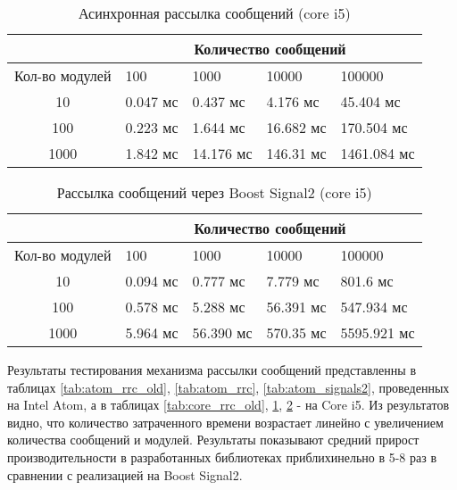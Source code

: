 \begin{table}[htb]
    \caption{\label{tab:core_rrc}Асинхронная рассылка сообщений (core i5)}
    \begin{center}
        \begin{tabularx}{\textwidth}{|c|X|X|X|X|}
            \hline
            & \multicolumn{4}{|c|}{Количество сообщений} \\
            \hline
            Кол-во модулей & 100   & 1000   & 10000   & 100000   \\
            \hline
            10             & 0.047 мс  & 0.437 мс   & 4.176 мс   & 45.404 мс   \\
            \hline
            100            & 0.223 мс  & 1.644 мс  & 16.682 мс  & 170.504 мс  \\
            \hline
            1000           & 1.842 мс & 14.176 мс & 146.31 мс & 1461.084 мс \\
            \hline
        \end{tabularx}
    \end{center}
\end{table}

\begin{table}[htb]
    \caption{\label{tab:core_signals2}Рассылка сообщений через Boost Signal2 (core i5)}
    \begin{center}
        \begin{tabularx}{\textwidth}{|c|X|X|X|X|}
            \hline
            & \multicolumn{4}{|c|}{Количество сообщений} \\
            \hline
            Кол-во модулей & 100   & 1000   & 10000   & 100000   \\
            \hline
            10             & 0.094 мс  & 0.777 мс   & 7.779 мс   & 801.6 мс   \\
            \hline
            100            & 0.578 мс  & 5.288 мс  & 56.391 мс  & 547.934 мс  \\
            \hline
            1000           & 5.964 мс & 56.390 мс & 570.35 мс & 5595.921 мс \\
            \hline
        \end{tabularx}
    \end{center}
\end{table}

Результаты тестирования механизма рассылки сообщений представленны в таблицах \ref{tab:atom_rrc_old}, \ref{tab:atom_rrc}, \ref{tab:atom_signals2}, проведенных на Intel Atom, а в таблицах \ref{tab:core_rrc_old}, \ref{tab:core_rrc}, \ref{tab:core_signals2} - на Core i5. Из результатов видно, что количество затраченного времени возрастает линейно с увеличением количества сообщений и модулей. Результаты показывают средний прирост производительности в разработанных библиотеках приблихинельно в 5-8 раз в сравнении с реализацией на Boost Signal2.


